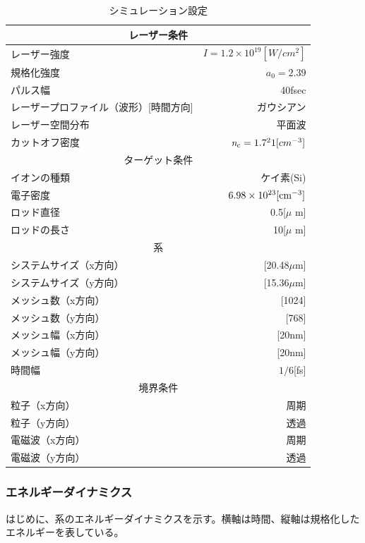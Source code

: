 \documentclass[a4paper,11pt,titlepage]{jarticle}
\numberwithin{equation}{section} %
\begin{document}
\begin{table}[H]
  \begin{center}
    \caption{シミュレーション設定}
  \begin{tabular}{|l|r|} \hline
    \multicolumn{2}{|c|}{レーザー条件} \\ \hline
    レーザー強度 & $\textit{I}=1.2\times  10^{19}[W/cm^2]$ \\ 
    規格化強度 & $\textit{a} _0 = 2.39$ \\
    パルス幅 & 40fsec \\ 
    レーザープロファイル（波形）[時間方向] & ガウシアン \\
    レーザー空間分布 & 平面波 \\
    カットオフ密度 & $\textit{n} _c = 1.7 \time 10^21 [cm^{-3}]$ \\\hline
    \multicolumn{2}{|c|}{ターゲット条件} \\ \hline
    イオンの種類 & ケイ素(Si) \\
    電子密度 &$6.98 \times  10 ^{23} [\rm{cm}^{-3}]$ \\
    ロッド直径 & 0.5[$\mu$ m] \\
    ロッドの長さ & 10[$\mu$ m]  \\ \hline
    \multicolumn{2}{|c|}{系} \\ \hline
    システムサイズ（x方向） & [20.48$\mu $m] \\
    システムサイズ（y方向） & [15.36$\mu $m] \\
    メッシュ数（x方向） & [1024] \\
    メッシュ数（y方向） & [768] \\
    メッシュ幅（x方向） & [20nm] \\
    メッシュ幅（y方向） & [20nm] \\
    時間幅 & $1/6$[fs] \\ \hline
    \multicolumn{2}{|c|}{境界条件} \\ \hline
    粒子（x方向） & 周期 \\
    粒子（y方向） & 透過 \\
    電磁波（x方向） & 周期 \\
    電磁波（y方向） & 透過 \\ \hline
  \end{tabular}
  \end{center}
  \end{table}

  \subsubsection{エネルギーダイナミクス}
  はじめに、系のエネルギーダイナミクスを示す。横軸は時間、縦軸は規格化したエネルギーを表している。
  
\end{document}
